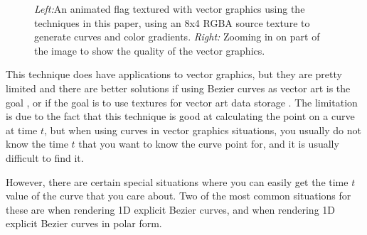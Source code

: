 \documentclass{jcgt}
\begin{document}
  \begin{figure}
    \hspace{-1.5cm}
    \caption{\textit{Left:}An animated flag textured with vector graphics using the techniques in this paper, using an 8x4 RGBA source texture to generate curves and color gradients.  \textit{Right:} Zooming in on part of the image to show the quality of the vector graphics.}   
    \label{fig:vectorgfx}
  \end{figure}

This technique does have applications to vector graphics, but they are pretty limited and there are better solutions if using Bezier curves as vector art is the goal \cite{Loop:2005:RIC:1073204.1073303,Nehab:2008:RRG:1409060.1409088}, or if the goal is to use textures for vector art data storage \cite{Green:2007:IAM:1281500.1281665}.  The limitation is due to the fact that this technique is good at calculating the point on a curve at time $t$, but when using curves in vector graphics situations, you usually do not know the time $t$ that you want to know the curve point for, and it is usually difficult to find it.

However, there are certain special situations where you can easily get the time $t$ value of the curve that you care about.  Two of the most common situations for these are when rendering 1D explicit Bezier curves, and when rendering 1D explicit Bezier curves in polar form.
\end{document}
